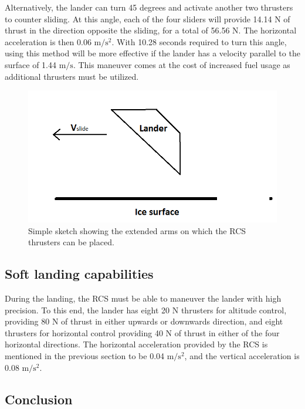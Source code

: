 \noindent
Alternatively, the lander can turn 45 degrees and activate another two thrusters to counter sliding. At this angle, each of the four sliders will provide 14.14 N of thrust in the direction opposite the sliding, for a total of 56.56 N. The horizontal acceleration is then 0.06 $\mathrm{m/s^2}$. With 10.28 seconds required to turn this angle, using this method will be more effective if the lander has a velocity parallel to the surface of 1.44 $\mathrm{m/s}$. This maneuver comes at the cost of increased fuel usage as additional thrusters must be utilized.

\begin{figure}[htb]
\begin{center}
\includegraphics[scale=0.8]{figures/RCS/Lunar_slide_angle}
\caption{Simple sketch showing the extended arms on which the RCS thrusters can be placed.}
\label{fig:lunar_slide_angle}
\end{center}
\end{figure}


\subsection{Soft landing capabilities}

During the landing, the RCS must be able to maneuver the lander with high precision. To this end, the lander has eight 20 N thrusters for altitude control, providing 80 N of thrust in either upwards or downwards direction, and eight thrusters for horizontal control providing 40 N of thrust in either of the four horizontal directions. The horizontal acceleration provided by the RCS is mentioned in the previous section to be 0.04 $\mathrm{m/s^2}$, and the vertical acceleration is 0.08 $\mathrm{m/s^2}$.

\subsection{Conclusion}

